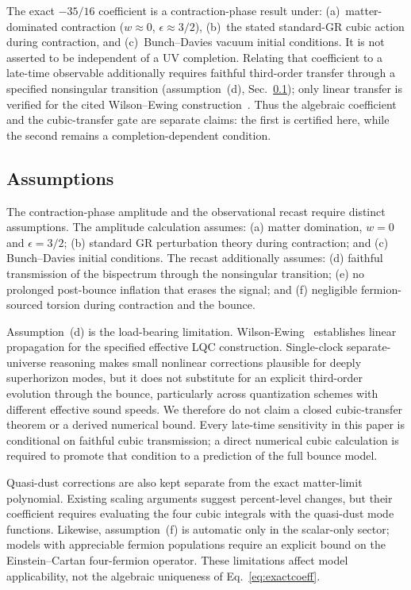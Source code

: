 \documentclass[aps,prd,twocolumn,superscriptaddress,showpacs,preprintnumbers,nofootinbib,longbibliography,floatfix]{revtex4-2}
\begin{document}
The exact $-35/16$ coefficient is a contraction-phase result under: (a)~matter-dominated contraction ($w \approx 0$, $\epsilon \approx 3/2$), (b)~the stated standard-GR cubic action during contraction, and (c)~Bunch--Davies vacuum initial conditions. It is not asserted to be independent of a UV completion. Relating that coefficient to a late-time observable additionally requires faithful third-order transfer through a specified nonsingular transition (assumption~(d), Sec.~\ref{sec:assumptions}); only linear transfer is verified for the cited Wilson--Ewing construction~\cite{WilsonEwing:2012}. Thus the algebraic coefficient and the cubic-transfer gate are separate claims: the first is certified here, while the second remains a completion-dependent condition.

\subsection{Assumptions}\label{sec:assumptions}

The contraction-phase amplitude and the observational recast require distinct assumptions. The amplitude calculation assumes: (a) matter domination, $w=0$ and $\epsilon=3/2$; (b) standard GR perturbation theory during contraction; and (c) Bunch--Davies initial conditions. The recast additionally assumes: (d) faithful transmission of the bispectrum through the nonsingular transition; (e) no prolonged post-bounce inflation that erases the signal; and (f) negligible fermion-sourced torsion during contraction and the bounce.

Assumption~(d) is the load-bearing limitation. Wilson-Ewing~\cite{WilsonEwing:2012} establishes linear propagation for the specified effective LQC construction. Single-clock separate-universe reasoning makes small nonlinear corrections plausible for deeply superhorizon modes, but it does not substitute for an explicit third-order evolution through the bounce, particularly across quantization schemes with different effective sound speeds. We therefore do not claim a closed cubic-transfer theorem or a derived numerical bound. Every late-time sensitivity in this paper is conditional on faithful cubic transmission; a direct numerical cubic calculation is required to promote that condition to a prediction of the full bounce model.

Quasi-dust corrections are also kept separate from the exact matter-limit polynomial. Existing scaling arguments suggest percent-level changes, but their coefficient requires evaluating the four cubic integrals with the quasi-dust mode functions. Likewise, assumption~(f) is automatic only in the scalar-only sector; models with appreciable fermion populations require an explicit bound on the Einstein--Cartan four-fermion operator. These limitations affect model applicability, not the algebraic uniqueness of Eq.~\eqref{eq:exactcoeff}.
\end{document}
